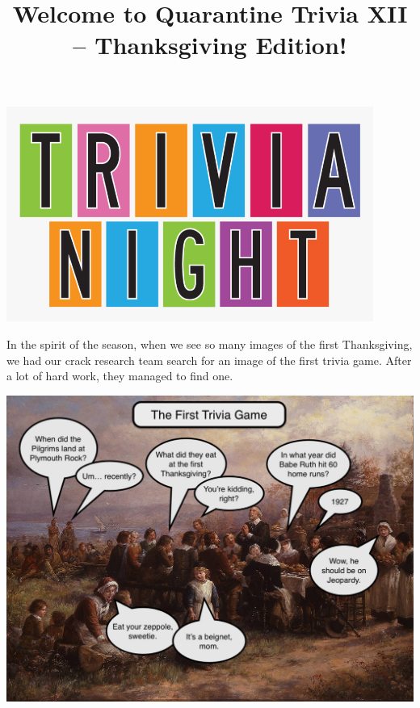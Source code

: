 \documentclass[11pt]{beamer}
\begin{document}
\title{Welcome to Quarantine Trivia XII -- Thanksgiving Edition!}
\date{}

\begin{frame}
\titlepage{}
\begin{center}
\includegraphics[max width=0.9\textwidth,
    max height=0.4\textheight]{Images/triviatitleframelogo.png}
\end{center}
\end{frame}
\begin{frame}
In the spirit of the season, when we see so many images of the first Thanksgiving, we had our crack research team search for an image of the first trivia game. After a lot of hard work, they managed to find one.
\pause
\begin{center}
\includegraphics[max width=.9\textwidth,
max height=0.9\textheight]{Images/firstthanksgiving.jpg}
\end{center}
\end{frame}
\end{document}
